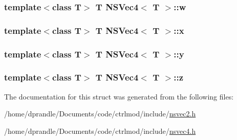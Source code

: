 \hypertarget{structNSVec4_aa8d4194ec57678f79e9cab21441074ee}{
\subsubsection[{w}]{\setlength{\rightskip}{0pt plus 5cm}template$<$class T$>$ T {\bf N\-S\-Vec4}$<$ T $>$\-::w}}\label{structNSVec4_aa8d4194ec57678f79e9cab21441074ee}
\hypertarget{structNSVec4_a938b634d36203d308a4da3dcf27edec2}{
\subsubsection[{x}]{\setlength{\rightskip}{0pt plus 5cm}template$<$class T$>$ T {\bf N\-S\-Vec4}$<$ T $>$\-::x}}\label{structNSVec4_a938b634d36203d308a4da3dcf27edec2}
\hypertarget{structNSVec4_a668c9fe6a39b8d0ef4db8f2e935e1662}{
\subsubsection[{y}]{\setlength{\rightskip}{0pt plus 5cm}template$<$class T$>$ T {\bf N\-S\-Vec4}$<$ T $>$\-::y}}\label{structNSVec4_a668c9fe6a39b8d0ef4db8f2e935e1662}
\hypertarget{structNSVec4_a9d570cf5c0cf44a6e86387de0ff59d7c}{
\subsubsection[{z}]{\setlength{\rightskip}{0pt plus 5cm}template$<$class T$>$ T {\bf N\-S\-Vec4}$<$ T $>$\-::z}}\label{structNSVec4_a9d570cf5c0cf44a6e86387de0ff59d7c}


The documentation for this struct was generated from the following files\-:\begin{DoxyCompactItemize}
\item 
/home/dprandle/\-Documents/code/ctrlmod/include/\hyperlink{nsvec2_8h}{nsvec2.\-h}\item 
/home/dprandle/\-Documents/code/ctrlmod/include/\hyperlink{nsvec4_8h}{nsvec4.\-h}\end{DoxyCompactItemize}
